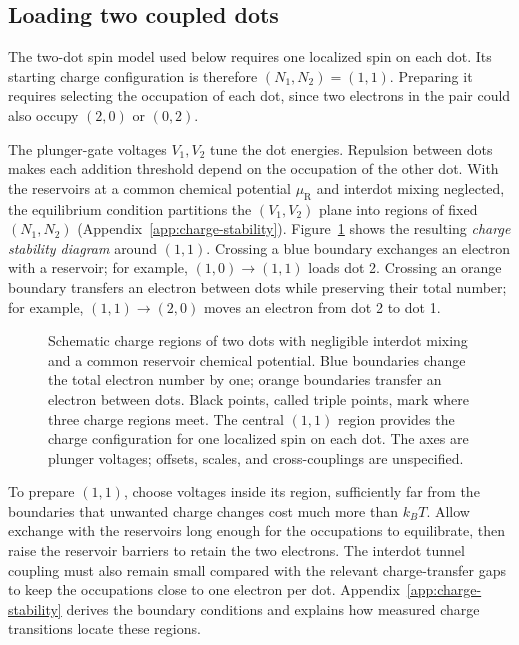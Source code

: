 \FloatBarrier
\subsection{Loading two coupled dots}
\label{sec:double-dot-loading}

The two-dot spin model used below requires one localized spin on
each dot. Its starting charge configuration is therefore $(N_1,N_2)=(1,1)$.
Preparing it requires selecting the occupation of each dot, since
two electrons in the pair could also occupy $(2,0)$ or $(0,2)$.

The plunger-gate voltages $V_1,V_2$ tune the dot energies. Repulsion
between dots makes each addition threshold depend on the occupation
of the other dot. With the reservoirs at a common chemical potential
$\mu_{\mathrm R}$ and interdot mixing neglected, the equilibrium
condition partitions the $(V_1,V_2)$ plane into regions of fixed
$(N_1,N_2)$ (Appendix~\ref{app:charge-stability}).
Figure~\ref{fig:measurement-honeycomb} shows the resulting
\emph{charge stability diagram} around $(1,1)$. Crossing a blue
boundary exchanges an electron with a reservoir; for example,
$(1,0)\to(1,1)$ loads dot 2. Crossing an orange boundary transfers
an electron between dots while preserving their total number;
for example, $(1,1)\to(2,0)$ moves an electron from dot 2 to dot 1.

\begin{figure}[htbp]
 \centering
 
 \caption{Schematic charge regions of two dots with negligible
 interdot mixing and a common reservoir chemical potential.
 Blue boundaries change the total electron number by one;
 orange boundaries transfer an electron between dots.
 Black points, called triple points, mark where three charge regions
 meet. The central $(1,1)$ region provides the charge configuration
 for one localized spin on each dot. The axes are plunger voltages;
 offsets, scales, and cross-couplings are unspecified.}
 \label{fig:measurement-honeycomb}
\end{figure}

To prepare $(1,1)$, choose voltages inside its region, sufficiently
far from the boundaries that unwanted charge changes cost much more
than $k_BT$. Allow exchange with the reservoirs long enough for the
occupations to equilibrate, then raise the reservoir barriers to
retain the two electrons. The interdot tunnel coupling must also
remain small compared with the relevant charge-transfer gaps to
keep the occupations close to one electron per dot. Appendix~\ref{app:charge-stability}
derives the boundary conditions and explains how measured charge
transitions locate these regions.

